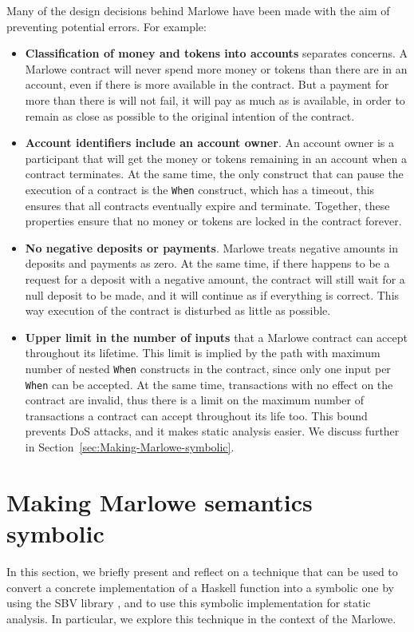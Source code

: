 \documentclass[english,runningheads]{llncs}
\begin{document}
Many of the design decisions behind Marlowe have been made with the
aim of preventing potential errors. For example:
\begin{itemize}
\item \textbf{Classification of money and tokens into accounts} separates concerns.
A Marlowe contract will never spend more money or tokens than there are in an
account, even if there is more available in the contract. But a payment
for more than there is will not fail, it will pay as much as
is available, in order to remain as close as possible
to the original intention of the contract.
\item \textbf{Account identifiers include an account owner}. An account owner
is a participant that will get the money or tokens remaining in an account
when a contract terminates. At the same time, the only construct that
can pause the execution of a contract is the \texttt{When} construct,
which has a timeout, this ensures that all contracts eventually expire
and terminate. Together, these properties ensure that no money or tokens
are locked in the contract forever.
\item \textbf{No negative deposits or payments}. Marlowe treats negative
amounts in deposits and payments as zero. At the same time,
if there happens to be a request for a deposit with a negative amount,
the contract will still wait for a null deposit to
be made, and it will continue as if everything is correct. This way execution
of the contract is disturbed as little as possible.
\item \textbf{Upper limit in the number of inputs} that a Marlowe contract
can accept throughout its lifetime. This limit is implied by the path with
maximum number of nested \texttt{When} constructs in the contract, since only
one input per \texttt{When} can be accepted. At the same time, transactions
with no effect on the contract are invalid, thus there is
a limit on the maximum number of transactions a contract can accept
throughout its life too. This bound prevents DoS attacks, and it makes static analysis
easier. We discuss further in Section~\ref{sec:Making-Marlowe-symbolic}.
\end{itemize}

\section{Making Marlowe semantics symbolic\label{sec:Making-Marlowe-symbolic}}

In this section, we briefly present and reflect on a technique that
can be used to convert a concrete implementation of a Haskell function
into a symbolic one by using the SBV library \cite{erkok2019sbv}, and to use this symbolic
implementation for static analysis. In particular, we explore this
technique in the context of the Marlowe.
\end{document}
